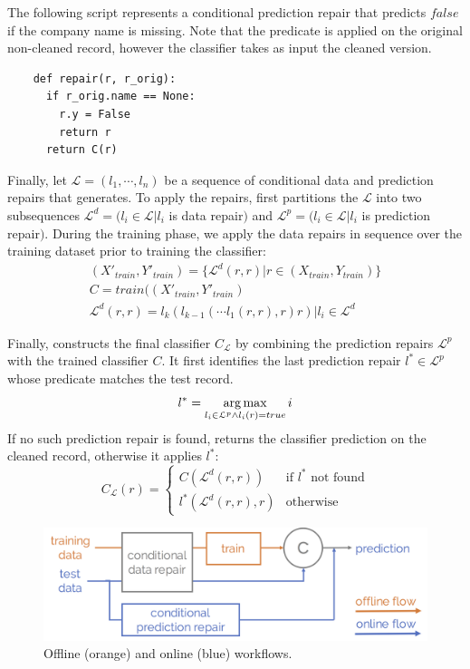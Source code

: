 \vspace{0.25em}
\begin{example}\sloppy
The following script represents a conditional prediction repair that 
predicts $false$ if the company name is missing.  Note that the predicate is applied on the original non-cleaned record, however the classifier takes as input the cleaned version.
{\small\begin{verbatim}
    def repair(r, r_orig):
      if r_orig.name == None:
        r.y = False
        return r
      return C(r)
\end{verbatim}}
\end{example}

\noindent Finally, let $\mathcal{L} = (l_1,\cdots,l_n)$ be a sequence of conditional data and prediction repairs that \sys generates. To apply the repairs, \sys first partitions the $\mathcal{L}$ into two subsequences $\mathcal{L}^d = (l_i \in \mathcal{L} | l_i$ is data repair$)$ and $\mathcal{L}^p = (l_i \in \mathcal{L} | l_i$ is prediction repair$)$.  During the training phase, we apply the data repairs in sequence over the training dataset prior to training the classifier:
\begin{align}
(X'_{train}, Y'_{train}) = \{\mathcal{L}^d(r, r) | r \in (X_{train}, Y_{train}) \}\\
C = train((X'_{train}, Y'_{train})\\
\mathcal{L}^d(r, r) = l_k(l_{k-1}(\cdots l_1(r, r), r) r) | l_i \in \mathcal{L}^d
\end{align}

Finally, \sys constructs the final classifier $C_{\mathcal{L}}$ by combining the prediction repairs $\mathcal{L}^p$ with the trained classifier $C$.  It first identifies the last prediction repair $l^* \in \mathcal{L}^p$ whose predicate matches the test record.  
$$l^* = \operatorname*{arg\,max}_{l_i \in \mathcal{L}^p \wedge l_i(r) = true} i$$
If no such prediction repair is found, \sys  returns the classifier prediction on the cleaned record, otherwise it applies $l^*$:
$$C_{\mathcal{L}}(r) = \begin{cases}
    C(\mathcal{L}^d(r, r))& \text{if } l^*\textrm{\ not\ found}\\
    l^*(\mathcal{L}^d(r, r), r) & \text{otherwise}
\end{cases}$$

\begin{figure}\centering
\includegraphics[width=\columnwidth]{figures/workflow.png}
\caption{Offline (orange) and online (blue) workflows.}
\label{fig:workflow}
\end{figure}

